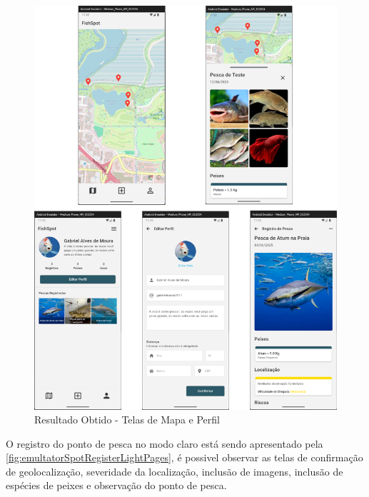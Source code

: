 \begin{figure}[H]
    \centering
    \caption{Resultado Obtido - Telas de Mapa e Perfil}
    \label{fig:emultatorMapAndPerfilPagesLight}
    \includegraphics[scale=0.35]{./dados/figuras/emulator-map-and-profile-light-pages.png}
\end{figure}

O registro do ponto de pesca no modo claro está sendo apresentado pela \autoref{fig:emultatorSpotRegisterLightPages}, é possivel observar as telas de confirmação de geolocalização, severidade da localização, inclusão de imagens, inclusão de espécies de peixes e observação do ponto de pesca.

